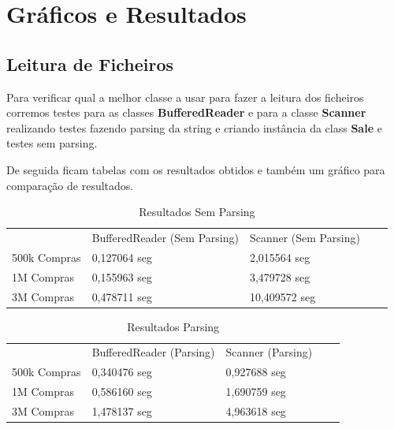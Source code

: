 \documentclass[10pt] {article}
\begin{document}
\newpage
\section{Gráficos e Resultados}
\subsection{Leitura de Ficheiros}

\par Para verificar qual a melhor classe a usar para fazer a leitura dos ficheiros corremos testes para as classes
\color{blue} \textbf{BufferedReader} \color{black} e para a classe\color{blue} \textbf{Scanner} \color{black} realizando testes
fazendo parsing da string e criando instância da class \color{blue} \textbf{Sale} \color{black} e testes sem parsing.
\par De seguida ficam tabelas com os resultados obtidos e também um gráfico para comparação de resultados.

\begin{table}[h]
\centering
\caption{Resultados Sem Parsing}
\label{my-label}
\begin{tabular}{l|l|l|ll}
\cline{2-3}
                                   & BufferedReader (Sem Parsing) & Scanner (Sem Parsing) &  &  \\ \cline{1-3}
\multicolumn{1}{|l|}{500k Compras} & 0,127064 seg                 & 2,015564 seg          &  &  \\ \cline{1-3}
\multicolumn{1}{|l|}{1M Compras}   & 0,155963 seg                 & 3,479728 seg          &  &  \\ \cline{1-3}
\multicolumn{1}{|l|}{3M Compras}   & 0,478711 seg                 & 10,409572 seg         &  &  \\ \cline{1-3}
\end{tabular}
\end{table}

\begin{table}[h]
\centering
\caption{Resultados Parsing}
\label{my-label}
\begin{tabular}{l|l|l|ll}
\cline{2-3}
                                   & BufferedReader (Parsing) & Scanner (Parsing) &  &  \\ \cline{1-3}
\multicolumn{1}{|l|}{500k Compras} & 0,340476 seg             & 0,927688 seg      &  &  \\ \cline{1-3}
\multicolumn{1}{|l|}{1M Compras}   & 0,586160 seg             & 1,690759 seg      &  &  \\ \cline{1-3}
\multicolumn{1}{|l|}{3M Compras}   & 1,478137 seg             & 4,963618 seg      &  &  \\ \cline{1-3}
\end{tabular}
\end{table}
\end{document}

